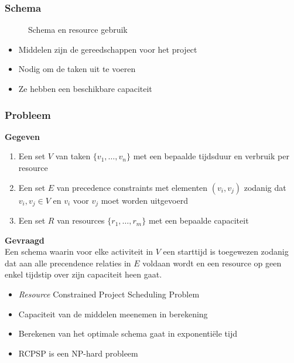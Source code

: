 \documentclass{beamer}
\theoremstyle{definition}
\newcommand{\inputtikz}[1]{}
\begin{document}
\begin{frame}
\frametitle{Schema}
	\vspace{-1.2em}
	\begin{figure}[ht]
		\makebox[\textwidth][c]{\resizebox{.36\paperwidth}{!}{
			\inputtikz{schedule_infeasible_colored_profile}
		}}
		\vspace{-1.3em}
		\caption{Schema en resource gebruik}
	\end{figure}
\end{frame}

\begin{frame}
	\begin{itemize}
		\item Middelen zijn de gereedschappen voor het project
		\item Nodig om de taken uit te voeren
		\item Ze hebben een beschikbare capaciteit
	\end{itemize}
\end{frame}

\begin{frame}
	\frametitle{Probleem}
	\textbf{Gegeven}
	\begin{enumerate}
		\item Een set $V$ van taken $\{v_1,\dots,v_n\}$ met een bepaalde tijdsduur en verbruik per resource
		\item Een set $E$ van precedence constraints met elementen $(v_i, v_j)$ zodanig dat $v_i, v_j \in V$ en $v_i$ voor $v_j$ moet worden uitgevoerd
		\item Een set $R$ van resources $\{r_1, \ldots, r_m\}$ met een bepaalde capaciteit
	\end{enumerate}
	
	\textbf{Gevraagd}\\
	Een schema waarin voor elke activiteit in $V$ een starttijd is toegewezen zodanig dat aan alle precendence relaties in $E$ voldaan wordt en een resource op geen enkel tijdstip over zijn capaciteit heen gaat.
\end{frame}

\begin{frame}
	\begin{itemize}
		\item \emph{Resource} Constrained Project Scheduling Problem
		\item Capaciteit van de middelen meenemen in berekening
		\item Berekenen van het optimale schema gaat in exponenti\"{e}le tijd
		\item RCPSP is een NP-hard probleem
	\end{itemize}
\end{frame}
\end{document}
